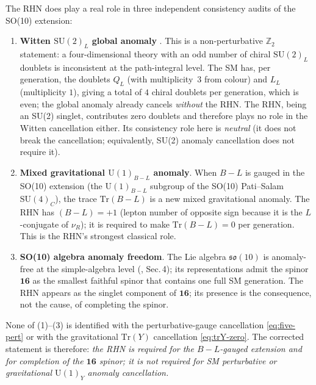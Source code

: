 The RHN does play a real role in three independent consistency audits
of the SO(10) extension:
\begin{enumerate}
  \item \textbf{Witten $\mathrm{SU}(2)_L$ global anomaly}
    \cite{Witten1982}. This is a non-perturbative
    $\mathbb{Z}_2$ statement: a four-dimensional theory with an odd
    number of chiral $\mathrm{SU}(2)_L$ doublets is inconsistent at
    the path-integral level. The SM has, per generation, the doublets
    $Q_L$ (with multiplicity~$3$ from colour) and $L_L$
    (multiplicity $1$), giving a total of $4$ chiral doublets per
    generation, which is even; the global anomaly already cancels
    \emph{without} the RHN. The RHN, being an SU(2) singlet,
    contributes zero doublets and therefore plays no role in the
    Witten cancellation either. Its consistency role here is
    \emph{neutral} (it does not break the cancellation; equivalently,
    SU(2) anomaly cancellation does not require it).

  \item \textbf{Mixed gravitational $\mathrm{U}(1)_{B-L}$ anomaly}.
    When $B-L$ is gauged in the SO(10) extension (the
    $\mathrm{U}(1)_{B-L}$ subgroup of the SO(10)
    Pati--Salam $\mathrm{SU}(4)_C$), the trace
    $\mathrm{Tr}(B-L)$ is a new mixed gravitational anomaly. The RHN
    has $(B-L) = +1$ (lepton number of opposite sign because it is the
    $L$-conjugate of $\nu_R$); it is required to make
    $\mathrm{Tr}(B-L) = 0$ per generation. This is the RHN's strongest
    classical role.

  \item \textbf{SO(10) algebra anomaly freedom}. The Lie algebra
    $\mathfrak{so}(10)$ is anomaly-free at the simple-algebra level
    (\cite{Slansky1981}, Sec.\,4); its representations admit the
    spinor $\mathbf{16}$ as the smallest faithful spinor that contains
    one full SM generation. The RHN appears as the singlet component
    of $\mathbf{16}$; its presence is the consequence, not the cause,
    of completing the spinor.
\end{enumerate}
None of (1)--(3) is identified with the perturbative-gauge cancellation
\eqref{eq:five-pert} or with the gravitational $\mathrm{Tr}(Y)$
cancellation \eqref{eq:trY-zero}. The corrected statement is therefore:
\emph{the RHN is required for the $B-L$-gauged extension and for
completion of the $\mathbf{16}$ spinor; it is not required for SM
perturbative or gravitational $\mathrm{U}(1)_Y$ anomaly cancellation.}


